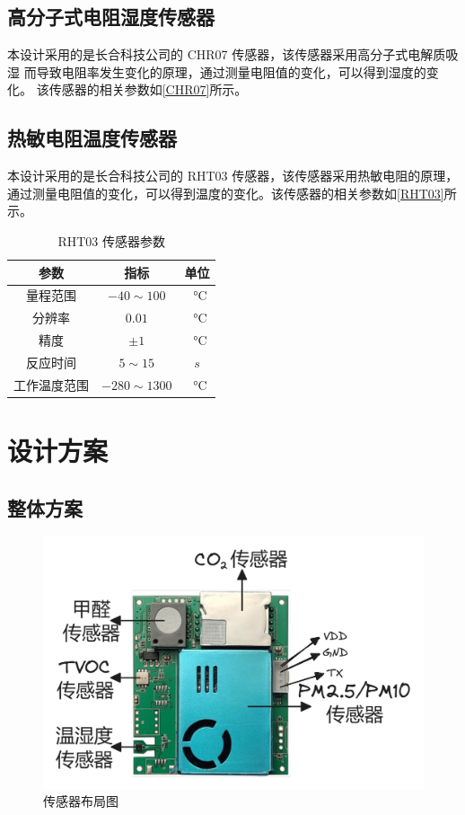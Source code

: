 \documentclass[12pt,hyperref,a4paper,UTF8]{ctexart}
\begin{document}
\subsection{高分子式电阻湿度传感器}
本设计采用的是长合科技公司的 CHR07 传感器，该传感器采用高分子式电解质吸湿
而导致电阻率发生变化的原理，通过测量电阻值的变化，可以得到湿度的变化。
该传感器的相关参数如\autoref{CHR07}所示。

\subsection{热敏电阻温度传感器}
本设计采用的是长合科技公司的 RHT03 传感器，该传感器采用热敏电阻的原理，
通过测量电阻值的变化，可以得到温度的变化。该传感器的相关参数如\autoref{RHT03}所示。

\begin{table}[htbp]
    \centering
    \caption{RHT03 传感器参数}
    \begin{tabular}{ccc}
        \toprule
        参数     & 指标               & 单位                  \\ \midrule
        量程范围   & $-40\sim 100 $   & \SI{}\degreeCelsius \\
        分辨率    & $0.01$           & \SI{}\degreeCelsius \\
        精度     & $\pm 1$          & \SI{}\degreeCelsius \\
        反应时间   & $5\sim 15$       & $s$                 \\
        工作温度范围 & $-280 \sim 1300$ & \SI{}\degreeCelsius \\
        \bottomrule
    \end{tabular}
    \label{RHT03}
\end{table}

\section{设计方案}

\subsection{整体方案}

\begin{figure}
    \centering
    \includegraphics[width =.4\textwidth]{figures/sensor.png}
    \caption{传感器布局图}
    \label{sensor}
\end{figure}
\end{document}
